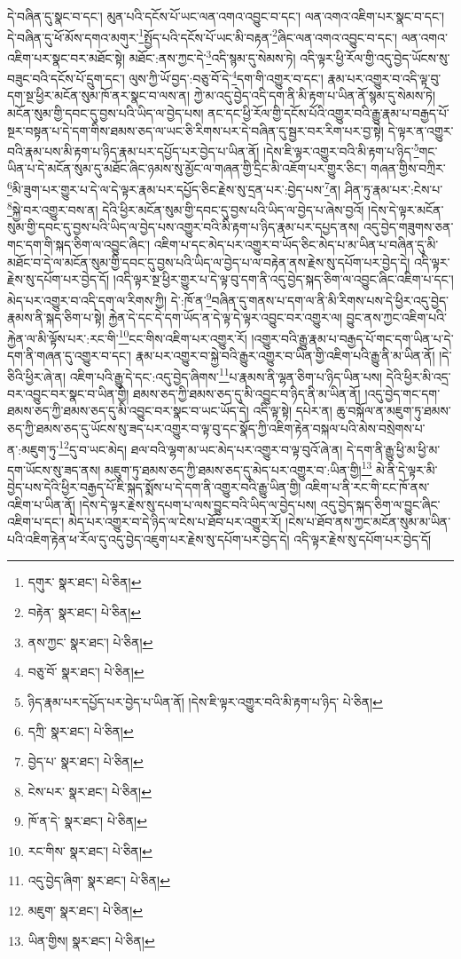 དེ་བཞིན་དུ་སྣང་བ་དང་། མུན་པའི་དངོས་པོ་ཡང་ལན་འགའ་འབྱུང་བ་དང་། ལན་འགའ་འཇིག་པར་སྣང་བ་དང་། དེ་བཞིན་དུ་ཕོ་མོས་དགའ་མགུར་\footnote{དགུར་  སྣར་ཐང་།  པེ་ཅིན། }སྤྱོད་པའི་དངོས་པོ་ཡང་མི་བརྟན་\footnote{བརྟེན་  སྣར་ཐང་།  པེ་ཅིན། }ཞིང་ལན་འགའ་འབྱུང་བ་དང་། ལན་འགའ་འཇིག་པར་སྣང་བར་མཐོང་སྟེ། མཐོང་:ནས་ཀྱང་དེ་\footnote{ནས་ཀྱང་  སྣར་ཐང་།  པེ་ཅིན། }འདི་སྙམ་དུ་སེམས་ཏེ། འདི་ལྟར་ཕྱི་རོལ་གྱི་འདུ་བྱེད་ཡོངས་སུ་བཟུང་བའི་དངོས་པོ་དྲུག་དང་། ལུས་ཀྱི་ཡོ་བྱད་:བཅུ་བོ་དེ་\footnote{བཅུ་བོ་  སྣར་ཐང་།  པེ་ཅིན། }དག་གི་འགྱུར་བ་དང་། རྣམ་པར་འགྱུར་བ་འདི་ལྟ་བུ་དག་སྔ་ཕྱིར་མངོན་སུམ་ཁོ་ནར་སྣང་བ་ལས་ན། ཀྱེ་མ་འདུ་བྱེད་འདི་དག་ནི་མི་རྟག་པ་ཡིན་ནོ་སྙམ་དུ་སེམས་ཏེ། མངོན་སུམ་གྱི་དབང་དུ་བྱས་པའི་ཡིད་ལ་བྱེད་པས། ནང་དང་ཕྱི་རོལ་གྱི་དངོས་པོའི་འགྱུར་བའི་རྒྱུ་རྣམ་པ་བརྒྱད་པོ་སྔར་བསྟན་པ་དེ་དག་གིས་ཐམས་ཅད་ལ་ཡང་ཅི་རིགས་པར་དེ་བཞིན་དུ་སྦྱར་བར་རིག་པར་བྱ་སྟེ། དེ་ལྟར་ན་འགྱུར་བའི་རྣམ་པས་མི་རྟག་པ་ཉིད་རྣམ་པར་དཔྱོད་པར་བྱེད་པ་ཡིན་ནོ། །དེས་ཇི་ལྟར་འགྱུར་བའི་མི་རྟག་པ་ཉིད་\footnote{ཉིད་རྣམ་པར་དཔྱོད་པར་བྱེད་པ་ཡིན་ནོ། །དེས་ཇི་ལྟར་འགྱུར་བའི་མི་རྟག་པ་ཉིད་  པེ་ཅིན། }གང་ཡིན་པ་དེ་མངོན་སུམ་དུ་མཐོང་ཞིང་ཉམས་སུ་མྱོང་ལ་གཞན་གྱི་དྲིང་མི་འཇོག་པར་གྱུར་ཅིང་། གཞན་གྱིས་བཀྲིར་\footnote{དཀྲི་  སྣར་ཐང་།  པེ་ཅིན། }མི་ཟུག་པར་གྱུར་པ་དེ་ལ་དེ་ལྟར་རྣམ་པར་དཔྱོད་ཅིང་རྗེས་སུ་དྲན་པར་:བྱེད་པས་\footnote{བྱེད་པ་  སྣར་ཐང་།  པེ་ཅིན། }ན། ཤིན་ཏུ་རྣམ་པར་:ངེས་པ་\footnote{ངེས་པར་  སྣར་ཐང་།  པེ་ཅིན། }སྐྱེ་བར་འགྱུར་བས་ན། དེའི་ཕྱིར་མངོན་སུམ་གྱི་དབང་དུ་བྱས་པའི་ཡིད་ལ་བྱེད་པ་ཞེས་བྱའོ། །དེས་དེ་ལྟར་མངོན་སུམ་གྱི་དབང་དུ་བྱས་པའི་ཡིད་ལ་བྱེད་པས་འགྱུར་བའི་མི་རྟག་པ་ཉིད་རྣམ་པར་དཔྱད་ནས། འདུ་བྱེད་གཟུགས་ཅན་གང་དག་གི་སྐད་ཅིག་ལ་འབྱུང་ཞིང་། འཇིག་པ་དང་མེད་པར་འགྱུར་བ་ཡོད་ཅིང་མེད་པ་མ་ཡིན་པ་བཞིན་དུ་མི་མཐོང་བ་དེ་ལ་མངོན་སུམ་གྱི་དབང་དུ་བྱས་པའི་ཡིད་ལ་བྱེད་པ་ལ་བརྟེན་ནས་རྗེས་སུ་དཔོག་པར་བྱེད་དེ། འདི་ལྟར་རྗེས་སུ་དཔོག་པར་བྱེད་དོ། །འདི་ལྟར་སྔ་ཕྱིར་གྱུར་པ་དེ་ལྟ་བུ་དག་ནི་འདུ་བྱེད་སྐད་ཅིག་ལ་འབྱུང་ཞིང་འཇིག་པ་དང་། མེད་པར་འགྱུར་བ་འདི་དག་ལ་རིགས་ཀྱི། དེ་:ཁོ་ན་\footnote{ཁོ་ན་དེ་  སྣར་ཐང་།  པེ་ཅིན། }བཞིན་དུ་གནས་པ་དག་ལ་ནི་མི་རིགས་པས་དེ་ཕྱིར་འདུ་བྱེད་རྣམས་ནི་སྐད་ཅིག་པ་སྟེ། རྐྱེན་དེ་དང་དེ་དག་ཡོད་ན་དེ་ལྟ་དེ་ལྟར་འབྱུང་བར་འགྱུར་ལ། བྱུང་ནས་ཀྱང་འཇིག་པའི་རྐྱེན་ལ་མི་ལྟོས་པར་:རང་གི་\footnote{རང་གིས་  སྣར་ཐང་།  པེ་ཅིན། }ངང་གིས་འཇིག་པར་འགྱུར་རོ། །འགྱུར་བའི་རྒྱུ་རྣམ་པ་བརྒྱད་པོ་གང་དག་ཡིན་པ་དེ་དག་ནི་གཞན་དུ་འགྱུར་བ་དང་། རྣམ་པར་འགྱུར་བ་སྐྱེ་བའི་རྒྱུར་འགྱུར་བ་ཡིན་གྱི་འཇིག་པའི་རྒྱུ་ནི་མ་ཡིན་ནོ། །དེ་ཅིའི་ཕྱིར་ཞེ་ན། འཇིག་པའི་རྒྱུ་དེ་དང་:འདུ་བྱེད་ཞིགས་\footnote{འདུ་བྱེད་ཞིག་  སྣར་ཐང་།  པེ་ཅིན། }པ་རྣམས་ནི་ལྷན་ཅིག་པ་ཉིད་ཡིན་པས། དེའི་ཕྱིར་མི་འདྲ་བར་འབྱུང་བར་སྣང་བ་ཡིན་གྱི། ཐམས་ཅད་ཀྱི་ཐམས་ཅད་དུ་མི་འབྱུང་བ་ཉིད་ནི་མ་ཡིན་ནོ། །འདུ་བྱེད་གང་དག་ཐམས་ཅད་ཀྱི་ཐམས་ཅད་དུ་མི་འབྱུང་བར་སྣང་བ་ཡང་ཡོད་དེ། འདི་ལྟ་སྟེ། དཔེར་ན། ཆུ་བསྐོལ་ན་མཇུག་ཏུ་ཐམས་ཅད་ཀྱི་ཐམས་ཅད་དུ་ཡོངས་སུ་ཟད་པར་འགྱུར་བ་ལྟ་བུ་དང་སྣོད་ཀྱི་འཇིག་རྟེན་བསྐལ་པའི་མེས་བསྲེགས་པ་ན་:མཇུག་ཏུ་\footnote{མཇུག་  སྣར་ཐང་།  པེ་ཅིན། }དུ་བ་ཡང་མེད། ཐལ་བའི་ལྷག་མ་ཡང་མེད་པར་འགྱུར་བ་ལྟ་བུའོ་ཞེ་ན། དེ་དག་ནི་རྒྱུ་ཕྱི་མ་ཕྱི་མ་དག་ཡོངས་སུ་ཟད་ནས། མཇུག་ཏུ་ཐམས་ཅད་ཀྱི་ཐམས་ཅད་དུ་མེད་པར་འགྱུར་བ་:ཡིན་གྱི།\footnote{ཡིན་གྱིས།  སྣར་ཐང་།  པེ་ཅིན། } མེ་ནི་དེ་ལྟར་མི་བྱེད་པས་དེའི་ཕྱིར་བརྒྱད་པོ་ཇི་སྐད་སྨོས་པ་དེ་དག་ནི་འགྱུར་བའི་རྒྱུ་ཡིན་གྱི། འཇིག་པ་ནི་རང་གི་ངང་ཁོ་ནས་འཇིག་པ་ཡིན་ནོ། །དེས་དེ་ལྟར་རྗེས་སུ་དཔག་པ་ལས་བྱུང་བའི་ཡིད་ལ་བྱེད་པས། འདུ་བྱེད་སྐད་ཅིག་ལ་བྱུང་ཞིང་འཇིག་པ་དང་། མེད་པར་འགྱུར་བ་དེ་ཉིད་ལ་ངེས་པ་ཐོབ་པར་འགྱུར་རོ། །ངེས་པ་ཐོབ་ནས་ཀྱང་མངོན་སུམ་མ་ཡིན་པའི་འཇིག་རྟེན་ཕ་རོལ་དུ་འདུ་བྱེད་འཇུག་པར་རྗེས་སུ་དཔོག་པར་བྱེད་དེ། འདི་ལྟར་རྗེས་སུ་དཔོག་པར་བྱེད་དོ། 